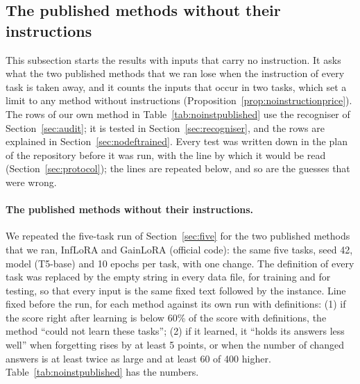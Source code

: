 \subsection{The published methods without their instructions}
\label{sec:nodefpublished}

This subsection starts the results with inputs that carry no instruction. It asks what the two published methods that we ran lose when the instruction of every task is taken away, and it counts the inputs that occur in two tasks, which set a limit to any method without instructions (Proposition~\ref{prop:noinstructionprice}). The rows of our own method in Table~\ref{tab:noinstpublished} use the recogniser \recog{} of Section~\ref{sec:audit}; it is tested in Section~\ref{sec:recogniser}, and the rows are explained in Section~\ref{sec:nodeftrained}.
Every test was written down in the plan of the repository before it was run, with the line by which it would be read (Section~\ref{sec:protocol}); the lines are repeated below, and so are the guesses that were wrong.

\paragraph{The published methods without their instructions.} We repeated the five-task run of Section~\ref{sec:five} for the two published methods that we ran, InfLoRA and GainLoRA (official code): the same five tasks, seed 42, model (T5-base) and 10 epochs per task, with one change.
The definition of every task was replaced by the empty string in every data file, for training and for testing, so that every input is the same fixed text followed by the instance.
Line fixed before the run, for each method against its own run with definitions: (1) if the score right after learning is below 60\% of the score with definitions, the method ``could not learn these tasks''; (2) if it learned, it ``holds its answers less well'' when forgetting rises by at least 5 points, or when the number of changed answers is at least twice as large and at least 60 of 400 higher.
Table~\ref{tab:noinstpublished} has the numbers.

\begin{table}[t]
  \caption{The five tasks of Section~\ref{sec:five}, T5-base, 10 epochs, seed 42, re-test (every reference answer is used). ``Definitions'': with the definition of every task in its inputs, or none (the empty string, in training and testing). Score right after learning: average score (Rouge-L) right after each task was learned. Final score: average final score. Forgetting: average forgetting. Answers changed: of the \AudPubCompared{} test inputs of the first four tasks, the answers that differ at the end from the answer right after their task was learned. Learned and AP are averages over the five tasks; FT and Changed are over the first four (the last task cannot be forgotten). The three rows of ours use plain adapters that are never blocked, with the routes of Section~\ref{sec:audit}; they were run without definitions only. The last row sends every input to its own task: the best that any route can give.}
  \label{tab:noinstpublished}
  \centering
  
\end{table}

